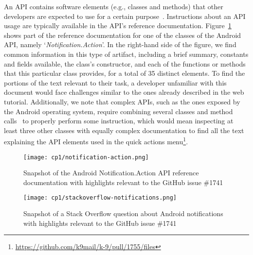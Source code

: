 An \acs{API} 
contains software elements (e.g., classes and methods) that other developers 
are   expected to use for a certain purpose~\cite{monperrus2012}. Instructions about an API usage are typically available in the API's reference documentation.
Figure~\ref{fig:api-notification-action} shows part of the reference documentation for one of the classes of the Android API, namely `\textit{Notification.Action}'. 
In the right-hand side of the figure, we find common 
information in this type of artifact, including a brief summary,
constants and fields available, the class's constructor, and 
each of the functions or methods that this particular class provides,  
for a total of 35 distinct elements.
To find the portions of the text relevant to
their task,
a developer unfamiliar with this document would 
face challenges similar to the ones already  described in the web tutorial. Additionally, 
we note that complex APIs, 
such as the ones exposed by the Android operating system, require combining several classes
and method calls~\cite{robillard2011field} to properly perform some instruction,
which would mean inspecting at least three other classes 
with equally complex documentation
to find all the text explaining the API elements used in the quick actions menu\footnote{\url{https://github.com/k9mail/k-9/pull/1755/files}}.





\begin{figure}
    \centering
    \texttt{[image: cp1/notification-action.png]}
    \caption{Snapshot of the Android Notification.Action API reference documentation with highlights relevant to the GitHub issue \#1741}
    \label{fig:api-notification-action}
\end{figure}





\begin{figure}
    \centering
    \texttt{[image: cp1/stackoverflow-notifications.png]}
    \caption{Snapshot of a Stack Overflow question about Android notifications  with highlights relevant to the GitHub issue \#1741}
    \label{fig:qa-notification-icon}
\end{figure}



